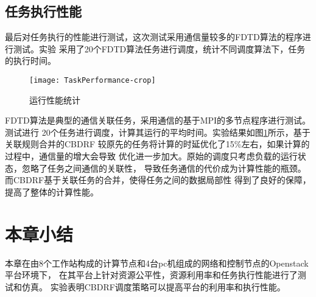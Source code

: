 \subsection{任务执行性能}
最后对任务执行的性能进行测试，这次测试采用通信量较多的FDTD算法的程序进行测试。实验
采用了20个FDTD算法任务进行调度，统计不同调度算法下，任务的执行时间。
\begin{figure}[htbp]
\centering\texttt{[image: TaskPerformance-crop]}
\caption{运行性能统计}\label{fig:TaskPerformance}
\end{figure}

FDTD算法是典型的通信关联任务，采用通信的基于MPI的多节点程序进行测试。测试进行
20个任务进行调度，计算其运行的平均时间。实验结果如图\ref{fig:TaskPerformance}所示，基于关联规则合并的CBDRF
较原先的任务将计算的时延优化了15\%左右，如果计算的过程中，通信量的增大会导致
优化进一步加大。原始的调度只考虑负载的运行状态，忽略了任务之间通信的关联性，
导致任务通信的代价成为计算性能的瓶颈。而CBDRF基于关联任务的合并，使得任务之间的数据局部性
得到了良好的保障，提高了整体的计算性能。

\section{本章小结}
本章在由8个工作站构成的计算节点和4台pc机组成的网络和控制节点的Openstack平台环境下，
在其平台上针对资源公平性，资源利用率和任务执行性能进行了测试和仿真。
实验表明CBDRF调度策略可以提高平台的利用率和执行性能。

